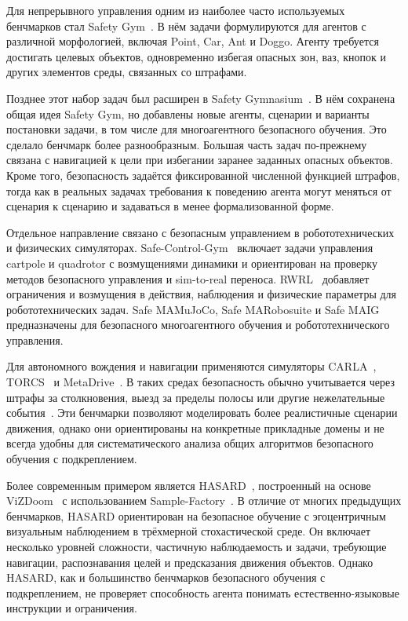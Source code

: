 Для непрерывного управления одним из наиболее часто используемых бенчмарков стал Safety Gym~\cite{ray2019benchmarking}. В нём задачи формулируются для агентов с различной морфологией, включая Point, Car, Ant и Doggo. Агенту требуется достигать целевых объектов, одновременно избегая опасных зон, ваз, кнопок и других элементов среды, связанных со штрафами.

Позднее этот набор задач был расширен в Safety Gymnasium~\cite{ji2023safetygymnasium}. В нём сохранена общая идея Safety Gym, но добавлены новые агенты, сценарии и варианты постановки задачи, в том числе для многоагентного безопасного обучения. Это сделало бенчмарк более разнообразным. Большая часть задач по-прежнему связана с навигацией к цели при избегании заранее заданных опасных объектов. Кроме того, безопасность задаётся фиксированной численной функцией штрафов, тогда как в реальных задачах требования к поведению агента могут меняться от сценария к сценарию и задаваться в менее формализованной форме.

Отдельное направление связано с безопасным управлением в робототехнических и физических симуляторах. Safe-Control-Gym~\cite{yuan2022safecontrolgym} включает задачи управления cartpole и quadrotor с возмущениями динамики и ориентирован на проверку методов безопасного управления и sim-to-real переноса. RWRL~\cite{dulac2020realworldrl} добавляет ограничения и возмущения в действия, наблюдения и физические параметры для робототехнических задач. Safe MAMuJoCo, Safe MARobosuite и Safe MAIG~\cite{gu2023safe_multiagent} предназначены для безопасного многоагентного обучения и робототехнического управления.

Для автономного вождения и навигации применяются симуляторы CARLA~\cite{dosovitskiy2017carla}, TORCS~\cite{wymann2000torcs} и MetaDrive~\cite{li2022metadrive}. В таких средах безопасность обычно учитывается через штрафы за столкновения, выезд за пределы полосы или другие нежелательные события~\cite{wang2018autonomous,nehme2023safe,hossain2023carla}. Эти бенчмарки позволяют моделировать более реалистичные сценарии движения, однако они ориентированы на конкретные прикладные домены и не всегда удобны для систематического анализа общих алгоритмов безопасного обучения с подкреплением.

Более современным примером является HASARD~\cite{hasard}, построенный на основе ViZDoom~\cite{kempka2016vizdoom} с использованием Sample-Factory~\cite{petrenko2020samplefactory}. В отличие от многих предыдущих бенчмарков, HASARD ориентирован на безопасное обучение с эгоцентричным визуальным наблюдением в трёхмерной стохастической среде. Он включает несколько уровней сложности, частичную наблюдаемость и задачи, требующие навигации, распознавания целей и предсказания движения объектов. Однако HASARD, как и большинство бенчмарков безопасного обучения с подкреплением, не проверяет способность агента понимать естественно-языковые инструкции и ограничения.

